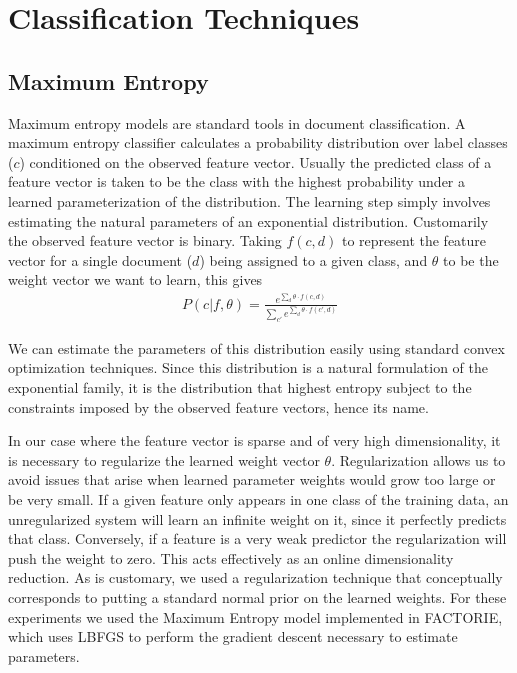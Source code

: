 \section{Classification Techniques}

\subsection{Maximum Entropy} %
\label{sub:maximum_entropy}

\indent
Maximum entropy models are standard tools in document classification\cite{Nigam99usingmaximum}. A maximum entropy classifier calculates a probability distribution over label classes ($c$) conditioned on the observed feature vector. Usually the predicted class of a feature vector is taken to be the class with the highest probability under a learned parameterization of the distribution. The learning step simply involves estimating the natural parameters of an exponential distribution. Customarily the observed feature vector is binary. Taking $f(c,d)$ to represent the feature vector for a single document ($d$) being assigned to a given class, and $\theta$ to be the weight vector we want to learn, this gives
\begin{align*}
	P(c|f, \theta) = \frac{e^{\sum_d \theta \cdot f(c, d)}}{\sum_{c'} e^{\sum_d \theta \cdot f(c',d)}}
\end{align*}

We can estimate the parameters of this distribution easily using standard convex optimization techniques. Since this distribution is a natural formulation of the exponential family, it is the distribution that highest entropy subject to the constraints imposed by the observed feature vectors, hence its name. 

In our case where the feature vector is sparse and of very high dimensionality, it is necessary to regularize the learned weight vector $\theta$. Regularization allows us to avoid issues that arise when learned parameter weights would grow too large or be very small. If a given feature only appears in one class of the training data, an unregularized system will learn an infinite weight on it, since it perfectly predicts that class. Conversely, if a feature is a very weak predictor the regularization will push the weight to zero. This acts effectively as an online dimensionality reduction. As is customary, we used a regularization technique that conceptually corresponds to putting a standard normal prior on the learned weights. For these experiments we used the Maximum Entropy model implemented in FACTORIE, which uses LBFGS\cite{Liu89onthe} to perform the gradient descent necessary to estimate parameters.

